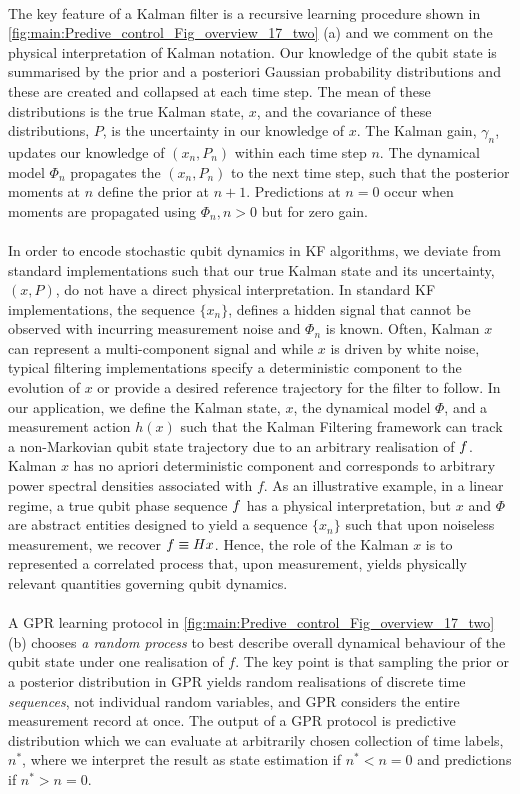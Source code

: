 \\
The key feature of a Kalman filter is a recursive learning procedure shown in \cref{fig:main:Predive_control_Fig_overview_17_two} (a) and we comment on the physical interpretation of Kalman notation. Our knowledge of the qubit state is summarised by the prior and a posteriori Gaussian probability distributions and these are created and collapsed at each time step. The mean of these distributions is the true Kalman state, $x$, and the covariance of these distributions, $P$, is the uncertainty in our knowledge of $x$. The Kalman gain, $\gamma_n$, updates our knowledge of $(x_n, P_n)$ within each time step $n$. The dynamical model  $\Phi_n$ propagates the $(x_n, P_n)$ to the next time step, such that the posterior moments at $n$ define the prior at $n+1$.  Predictions at $n=0$ occur when moments are propagated using $\Phi_n, n>0 $ but for zero gain. 
\\
\\
In order to encode stochastic qubit dynamics in KF algorithms, we deviate from standard implementations such that our true Kalman state and its uncertainty, $(x, P)$, do not have a direct physical interpretation. In standard KF implementations, the sequence $\{x_n\}$, defines a hidden signal that cannot be observed with incurring measurement noise and $\Phi_n$ is known. Often, Kalman $x$ can represent a multi-component signal and while $x$ is driven by white noise, typical filtering implementations specify a deterministic component to the evolution of $x$ or provide a desired reference trajectory for the filter to follow. In our application, we define the Kalman state, $x$, the dynamical model $\Phi$, and a measurement action $h(x)$ such that the Kalman Filtering framework can track a non-Markovian qubit state trajectory due to an arbitrary realisation of $f$.  Kalman $x$ has no apriori deterministic component and corresponds to arbitrary power spectral densities associated with $f$. As an illustrative example, in a linear regime, a true qubit phase sequence $f$ has a physical interpretation, but $x$ and $\Phi$ are abstract entities designed to yield a sequence $\{x_n\}$  such that upon noiseless measurement, we recover $f \equiv Hx$. Hence, the role of the Kalman $x$ is to represented a correlated process that, upon measurement, yields physically relevant quantities governing qubit dynamics.
\\
\\
A GPR learning protocol in \cref{fig:main:Predive_control_Fig_overview_17_two} (b)  chooses \textit{a random process} to best describe overall dynamical behaviour of the qubit state under one realisation of $f$. The key point is that sampling the prior or a posterior distribution in GPR yields random realisations of discrete time \textit{sequences}, not  individual random variables, and GPR considers the entire measurement record at once. The output of a GPR protocol is predictive distribution which we can evaluate at arbitrarily chosen collection of time labels, $n^*$, where we interpret the result as state estimation if $n^* < n =0$ and predictions if $n^* > n =0$. 
